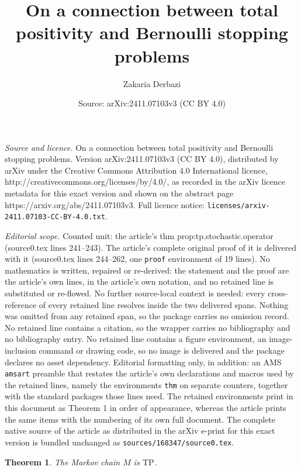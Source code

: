 \documentclass[10pt,a4paper]{amsart}
\title{On a connection between total positivity and Bernoulli stopping problems}
\author{Zakaria Derbazi}
\date{Source: arXiv:2411.07103v3 (CC BY 4.0)}
\newtheorem{thm}{Theorem}
\newcommand{\TP}[1]{\textrm{TP}_{#1}}
\begin{document}
\maketitle

\noindent\emph{Source and licence.} On a connection between total positivity and Bernoulli stopping problems. Version arXiv:2411.07103v3 (CC BY 4.0), distributed by arXiv under the Creative Commons Attribution 4.0 International licence, http://creativecommons.org/licenses/by/4.0/, as recorded in the arXiv licence metadata for this exact version and shown on the abstract page https://arxiv.org/abs/2411.07103v3. Full licence notice: \texttt{licenses/arxiv-2411.07103-CC-BY-4.0.txt}.\par\smallskip

\noindent\textit{Editorial scope.} Counted unit: the article's thm prop:tp.stochastic.operator (source0.tex lines 241--243). The article's complete original proof of it is delivered with it (source0.tex lines 244--262, one \texttt{proof} environment of 19 lines). No mathematics is written, repaired or re-derived: the statement and the proof are the article's own lines, in the article's own notation, and no retained line is substituted or re-flowed.  No further source-local context is needed: every cross-reference of every retained line resolves inside the two delivered spans.  Nothing was omitted from any retained span, so the package carries no omission record.  No retained line contains a citation, so the wrapper carries no bibliography and no bibliography entry.  No retained line contains a figure environment, an image-inclusion command or drawing code, so no image is delivered and the package declares no asset dependency.  Editorial formatting only, in addition: an AMS \texttt{amsart} preamble that restates the article's own declarations and macros used by the retained lines, namely the environments \texttt{thm} on separate counters, together with the standard packages those lines need.  The retained environments print in this document as Theorem 1 in order of appearance, whereas the article prints the same items with the numbering of its own full document.  The complete native source of the article as distributed in the arXiv e-print for this exact version is bundled unchanged as \texttt{sources/168347/source0.tex}.
	\begin{thm}\label{prop:tp.stochastic.operator}
		The Markov chain $M$  is $\TP{}$.
	\end{thm}
\end{document}
